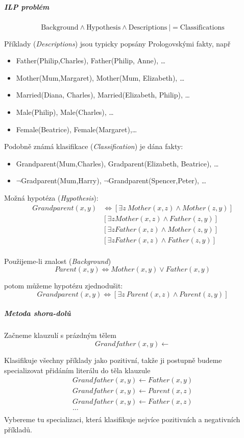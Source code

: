 \documentclass[11pt]{report} %
\numberwithin{equation}{section}
\begin{document}
\subparagraph{ILP problém}
$$\text{Background} \wedge \text{Hypothesis} \wedge \text{Descriptions}\ {|}= \text{Classifications}$$

Příklady (\textit{Descriptions}) jsou typicky popsány Prologovskými fakty, např
\begin{itemize}
\item Father(Philip,Charles), Father(Philip, Anne), …
\item Mother(Mum,Margaret), Mother(Mum, Elizabeth), …
\item Married(Diana, Charles), Married(Elizabeth, Philip), …
\item Male(Philip), Male(Charles), …
\item Female(Beatrice), Female(Margaret),…
\end{itemize}

Podobně známá klasifikace (\textit{Classification}) je dána fakty:
\begin{itemize}
\item Grandparent(Mum,Charles), Gradparent(Elizabeth, Beatrice), …
\item $\lnot$Gradparent(Mum,Harry), $\lnot$Grandparent(Spencer,Peter), …
\end{itemize}

Možná hypotéza (\textit{Hypothesis}):
\begin{align*}
Grandparent(x,y) &\Leftrightarrow [\exists z\ Mother(x,z) \wedge Mother(z,y)]\\
&[\exists z Mother(x,z) \wedge Father(z,y)] \\
&[\exists z Father(x,z) \wedge Mother(z,y)] \\
&[\exists z Father(x,z) \wedge Father(z,y)] \\
\end{align*}

Použijeme-li znalost (\textit{Background})
$$Parent(x,y) \Leftrightarrow Mother(x,y) \vee Father(x,y)$$

potom můžeme hypotézu zjednodušit:
$$Grandparent(x,y) \Leftrightarrow [\exists z\ Parent(x,z) \wedge Parent(z,y)]$$

\subparagraph{Metoda shora-dolů}
Začneme klauzulí s prázdným tělem
$$Grandfather(x,y) \gets $$

Klasifikuje všechny příklady jako pozitivní, takže ji postupně budeme specializovat
přidáním literálu do těla klauzule
\begin{align*}
Grandfather(x,y) \gets Father(x,y) \\
Grandfather(x,y) \gets Parent(x,z) \\
Grandfather(x,y) \gets Father(x,z) \\
\dots \\
\end{align*}
Vybereme tu specializaci, která klasifikuje nejvíce pozitivních a negativních příkladů.
\end{document}
